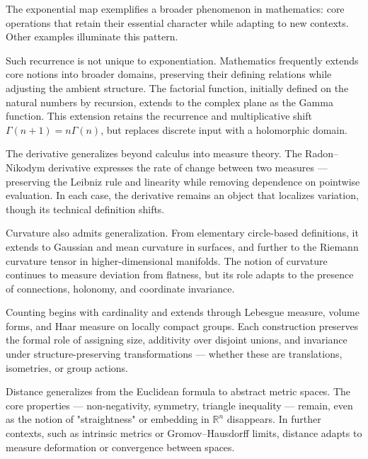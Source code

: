 \begin{commentary}[Generalizations]
The exponential map exemplifies a broader phenomenon in mathematics: core operations that retain their essential character while adapting to new contexts. Other examples illuminate this pattern.

Such recurrence is not unique to exponentiation. Mathematics frequently extends core notions into broader domains, preserving their defining relations while adjusting the ambient structure. The factorial function, initially defined on the natural numbers by recursion, extends to the complex plane as the Gamma function. This extension retains the recurrence and multiplicative shift \( \Gamma(n+1) = n\Gamma(n) \), but replaces discrete input with a holomorphic domain.

The derivative generalizes beyond calculus into measure theory. The Radon–Nikodym derivative expresses the rate of change between two measures — preserving the Leibniz rule and linearity while removing dependence on pointwise evaluation. In each case, the derivative remains an object that localizes variation, though its technical definition shifts.

Curvature also admits generalization. From elementary circle-based definitions, it extends to Gaussian and mean curvature in surfaces, and further to the Riemann curvature tensor in higher-dimensional manifolds. The notion of curvature continues to measure deviation from flatness, but its role adapts to the presence of connections, holonomy, and coordinate invariance.

Counting begins with cardinality and extends through Lebesgue measure, volume forms, and Haar measure on locally compact groups. Each construction preserves the formal role of assigning size, additivity over disjoint unions, and invariance under structure-preserving transformations — whether these are translations, isometries, or group actions.

Distance generalizes from the Euclidean formula to abstract metric spaces. The core properties — non-negativity, symmetry, triangle inequality — remain, even as the notion of "straightness" or embedding in $\mathbb{R}^n$ disappears. In further contexts, such as intrinsic metrics or Gromov–Hausdorff limits, distance adapts to measure deformation or convergence between spaces.

\end{commentary}

\vspace{1em}

